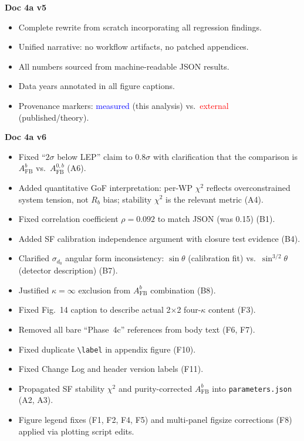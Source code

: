 \documentclass[11pt,a4paper]{article}
\newcommand{\measured}[1]{\textcolor{blue}{#1}}
\newcommand{\external}[1]{\textcolor{red}{#1}}
\begin{document}
\textbf{Doc 4a v5}
\begin{itemize}
\item Complete rewrite from scratch incorporating all regression findings.
\item Unified narrative: no workflow artifacts, no patched appendices.
\item All numbers sourced from machine-readable JSON results.
\item Data years annotated in all figure captions.
\item Provenance markers: \measured{measured} (this analysis) vs.\ \external{external} (published/theory).
\end{itemize}

\textbf{Doc 4a v6}
\begin{itemize}
\item Fixed ``$2\sigma$ below LEP'' claim to $0.8\sigma$ with clarification
  that the comparison is $A_\text{FB}^b$ vs.\ $A_\text{FB}^{0,b}$ (A6).
\item Added quantitative GoF interpretation: per-WP $\chi^2$ reflects
  overconstrained system tension, not $R_b$ bias; stability $\chi^2$
  is the relevant metric (A4).
\item Fixed correlation coefficient $\rho = 0.092$ to match JSON (was 0.15) (B1).
\item Added SF calibration independence argument with closure test evidence (B4).
\item Clarified $\sigma_{d_0}$ angular form inconsistency:
  $\sin\theta$ (calibration fit) vs.\ $\sin^{3/2}\theta$ (detector description) (B7).
\item Justified $\kappa = \infty$ exclusion from $A_\text{FB}^b$ combination (B8).
\item Fixed Fig.~14 caption to describe actual 2$\times$2 four-$\kappa$ content (F3).
\item Removed all bare ``Phase~4c'' references from body text (F6, F7).
\item Fixed duplicate \verb|\label| in appendix figure (F10).
\item Fixed Change Log and header version labels (F11).
\item Propagated SF stability $\chi^2$ and purity-corrected $A_\text{FB}^b$
  into \texttt{parameters.json} (A2, A3).
\item Figure legend fixes (F1, F2, F4, F5) and multi-panel figsize
  corrections (F8) applied via plotting script edits.
\end{itemize}
\end{document}

